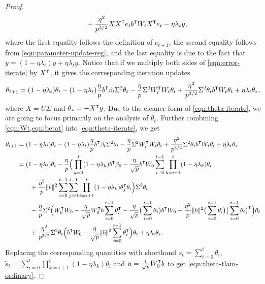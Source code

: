 \begin{proof}
\begin{align}
\begin{split}
            & \qquad + \frac{\eta^2}{p^{3/2}}XX\transpose e_t b\transpose W_t X\transpose e_t - \eta\lambda_t y, 
        \end{split}
    \end{align}
    where the first equality follows the definition of $e_{t+1}$, the second equality follows from \cref{eqn:parameter-update-reg}, and the last equality is due to the fact that $y = (1-\eta\lambda_t)y + \eta\lambda_t y$. Notice that if we multiply both sides of \cref{eqn:error-iterate} by $X\transpose$, it gives the corresponding iteration updates
    \begin{align}\label{eqn:theta-iterate}
        \theta_{t+1} = (1-\eta\lambda_t)\theta_t - (1-\eta\lambda_t) \frac{\eta}{p} b\transpose\beta_t \Sigma^2\theta_t - \frac{\eta}{p} \Sigma^2 W_t\transpose W_t\theta_t + \frac{\eta^2}{p^{3/2}}\Sigma^2\theta_t b\transpose W_t \theta_t + \eta\lambda_t \theta_\ast, 
    \end{align}
    where $X = U\Sigma$ and $\theta_\ast = -X\transpose y$. Due to the cleaner form of \cref{eqn:theta-iterate}, we are going to focus primarily on the analysis of $\theta_t$. Further combining \cref{eqn:Wt,eqn:betat} into \cref{eqn:theta-iterate}, we get
    \begin{align*}
        \theta_{t+1} & = (1-\eta\lambda_t)\theta_t - (1-\eta\lambda_t)\frac{\eta}{p}b\transpose\beta_t \Sigma^2\theta_t - \frac{\eta}{p}\Sigma^2 W_t\transpose W_t\theta_t + \frac{\eta^2}{p^{3/2}}\Sigma^2\theta_t b\transpose W_t \theta_t + \eta\lambda_t \theta_\ast \\
        & = (1-\eta\lambda_t)\theta_t - \frac{\eta}{p}\Big(\prod_{k=0}^t(1-\eta\lambda_k)b\transpose \beta_0 - \frac{\eta}{\sqrt p} b\transpose W_0\sum_{i=0}^{t-1}\prod_{k=i+1}^t(1-\eta\lambda_k)\theta_i \\
        & \qquad  + \frac{\eta^2}{p}\|b\|^2\sum_{i=0}^{t-1}\sum_{j=0}^{i-1}\prod_{k=i+1}^t(1-\eta\lambda_k)\theta_j\transpose\theta_i \Big)\Sigma^2\theta_t \\
        & \qquad - \frac{\eta}{p}\Sigma^2\Big( W_0\transpose W_0 - \frac{\eta}{\sqrt p}W_0\transpose b\sum_{i=0}^{t-1}\theta_i\transpose -\frac{\eta}{\sqrt p}\big(\sum_{i=0}^{t-1}\theta_i\big)b\transpose W_0 + \frac{\eta^2}{p}\|b\|^2 \big(\sum_{i=0}^{t-1}\theta_i\big)\big(\sum_{i=0}^{t-1}\theta_i\big)\transpose\Big)\theta_t \\
        & \qquad + \frac{\eta^2}{p^{3/2}}\Sigma^2\theta_t\Big(b\transpose W_0 - \frac{\eta}{\sqrt p}\|b\|^2 \sum_{i=0}^{t-1}\theta_i\transpose\Big)\theta_t + \eta\lambda_t \theta_\ast.
    \end{align*}
    Replacing the corresponding quantities with shorthand $s_{t} = \sum_{i=0}^{t} \theta_i$, $\tilde s_{t} = \sum_{i=0}^{t} \prod_{k=i+1}^t (1-\eta\lambda_k)\theta_i$ and $u = \frac{1}{\sqrt{p}} W_0\transpose b$ to get \cref{eqn:theta-tlam-ordinary}.
\end{proof}

